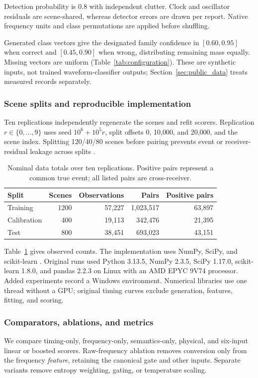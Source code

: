 Detection probability is 0.8 with independent clutter. Clock and oscillator residuals are scene-shared, whereas detector errors are drawn per report. Native frequency units and class permutations are applied before shuffling.

Generated class vectors give the designated family confidence in $[0.60,0.95]$ when correct and $[0.45,0.90]$ when wrong, distributing remaining mass equally. Missing vectors are uniform (Table~\ref{tab:configuration}). These are synthetic inputs, not trained waveform-classifier outputs; Section~\ref{sec:public_data} treats measured records separately.

\subsubsection{Scene splits and reproducible implementation}
Ten replications independently regenerate the scenes and refit scorers. Replication $r\in\{0,\ldots,9\}$ uses seed $10^6+10^5r$, split offsets 0, 10,000, and 20,000, and the scene index. Splitting 120/40/80 scenes before pairing prevents event or receiver-residual leakage across splits \cite{kapoor}.

\begin{table}[!t]\caption{Nominal data totals over ten replications. Positive pairs represent a common true event; all listed pairs are cross-receiver.}\label{tab:splits}
\centering\small\renewcommand{\arraystretch}{1.12}
\begin{tabular}{lrrrr}\toprule
Split & Scenes & Observations & Pairs & Positive pairs \\\midrule
Training & 1200 & 57,227 & 1,023,517 & 63,897 \\
Calibration & 400 & 19,113 & 342,476 & 21,395 \\
Test & 800 & 38,451 & 693,023 & 43,151 \\\bottomrule
\end{tabular}\end{table}

Table~\ref{tab:splits} gives observed counts. The implementation uses NumPy, SciPy, and scikit-learn \cite{sklearn,scipy}. Original runs used Python 3.13.5, NumPy 2.3.5, SciPy 1.17.0, scikit-learn 1.8.0, and pandas 2.2.3 on Linux with an AMD EPYC 9V74 processor. Added experiments record a Windows environment. Numerical libraries use one thread without a GPU; original timing curves exclude generation, features, fitting, and scoring.

\subsubsection{Comparators, ablations, and metrics}
We compare timing-only, frequency-only, semantics-only, physical, and six-input linear or boosted scorers. Raw-frequency ablation removes conversion only from the frequency \emph{feature}, retaining the canonical gate and other inputs. Separate variants remove entropy weighting, gating, or temperature scaling.


